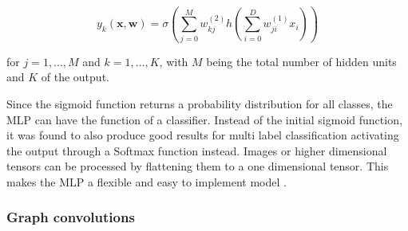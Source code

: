 \begin{equation}
    y_{k}(\mathbf{x}, \mathbf{w})=\sigma\left(\sum_{j=0}^{M} w_{k j}^{(2)} h\left(\sum_{i=0}^{D} w_{j i}^{(1)} x_{i}\right)\right)
\end{equation}

for $j=1, \ldots, M$ and $k=1, \ldots, K$, with $M$ being the total number of hidden units and $K$ of the output.

Since the sigmoid function returns a probability distribution for all classes, the MLP can have the function of a classifier. Instead of the initial sigmoid function, it was found to also produce good results for multi label classification activating the output through a Softmax function instead. Images or higher dimensional tensors can be processed by flattening them to a one dimensional tensor. This makes the MLP a flexible and easy to implement model \cite{bishop_pattern_2006}.


\subsubsection{Graph convolutions}
\label{ssec:gcn}

